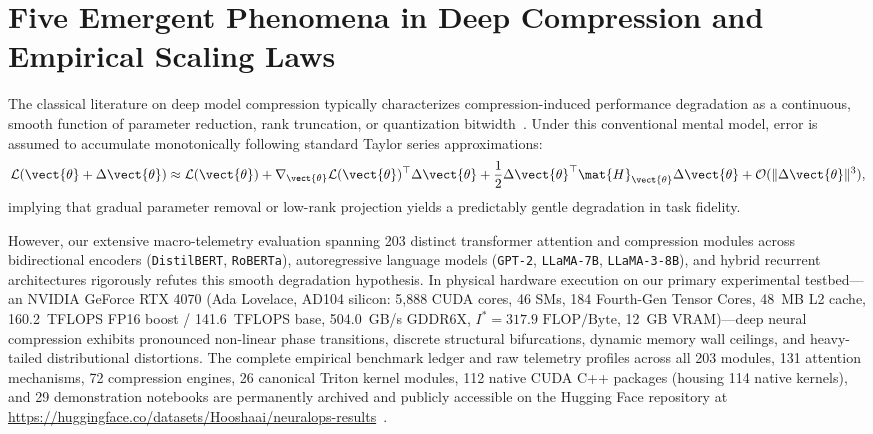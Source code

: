 \section{Five Emergent Phenomena in Deep Compression and Empirical Scaling Laws}
\label{sec:emergent_phenomena}

The classical literature on deep model compression typically characterizes compression-induced performance degradation as a continuous, smooth function of parameter reduction, rank truncation, or quantization bitwidth~\cite{han2015deep,frantar2023gptq,dettmers2022llmint8}. Under this conventional mental model, error is assumed to accumulate monotonically following standard Taylor series approximations:
\begin{equation}
\label{eq:classical_error_accumulation}
\mathcal{L}(\vect{\theta} + \Delta\vect{\theta}) \approx \mathcal{L}(\vect{\theta}) + \nabla_{\vect{\theta}}\mathcal{L}(\vect{\theta})^\top \Delta\vect{\theta} + \frac{1}{2} \Delta\vect{\theta}^\top \mat{H}_{\vect{\theta}} \Delta\vect{\theta} + \mathcal{O}(\|\Delta\vect{\theta}\|^3),
\end{equation}
implying that gradual parameter removal or low-rank projection yields a predictably gentle degradation in task fidelity.

However, our extensive macro-telemetry evaluation spanning 203 distinct transformer attention and compression modules across bidirectional encoders (\texttt{DistilBERT}, \texttt{RoBERTa}), autoregressive language models (\texttt{GPT-2}, \texttt{LLaMA-7B}, \texttt{LLaMA-3-8B}), and hybrid recurrent architectures rigorously refutes this smooth degradation hypothesis. In physical hardware execution on our primary experimental testbed---an NVIDIA GeForce RTX 4070 (Ada Lovelace, AD104 silicon: 5,888 CUDA cores, 46 SMs, 184 Fourth-Gen Tensor Cores, 48~MB L2 cache, 160.2~TFLOPS FP16 boost / 141.6~TFLOPS base, 504.0~GB/s GDDR6X, $I^* = 317.9\text{ FLOP/Byte}$, 12~GB VRAM)---deep neural compression exhibits pronounced non-linear phase transitions, discrete structural bifurcations, dynamic memory wall ceilings, and heavy-tailed distributional distortions. The complete empirical benchmark ledger and raw telemetry profiles across all 203 modules, 131 attention mechanisms, 72 compression engines, 26 canonical Triton kernel modules, 112 native CUDA C++ packages (housing 114 native kernels), and 29 demonstration notebooks are permanently archived and publicly accessible on the Hugging Face repository at \url{https://huggingface.co/datasets/Hooshaai/neuralops-results}~\cite{neuralops_results_hf}.

